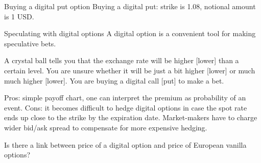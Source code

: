 \documentclass{beamer}
\begin{document}
\begin{frame}{Buying a digital put option}
\justifying
Buying a digital put: strike is 1.08, notional amount is 1 USD.

\justifying
\centering
{}
\end{frame}



\begin{frame}{Speculating with digital options}
\justify
A digital option is a convenient tool for making speculative bets.

\justify
A crystal ball tells you that the exchange rate will be higher [lower] than a certain level. You are unsure whether it will be just a bit higher [lower] or much much higher [lower]. You are buying a digital call [put] to make a bet.

\justify
Pros: simple payoff chart, one can interpret the premium as probability of an event. Cons: it becomes difficult to hedge digital options in case the spot rate ends up close to the strike by the expiration date. Market-makers have to charge wider bid/ask spread to compensate for more expensive hedging.

\justify
Is there a link between price of a digital option and price of European vanilla options?
\end{frame}
\end{document}
